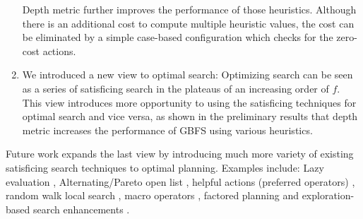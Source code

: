 \begin{enumerate}
       Depth metric further improves the performance of those
       heuristics. Although there is an additional cost to compute
       multiple heuristic values, the cost can be eliminated by a simple
       case-based configuration which checks for the zero-cost actions.
 \item We introduced a new view to optimal \astar search: Optimizing search can be seen as a series of satisficing
       search in the plateaus of an increasing order of $f$. This view introduces more opportunity to using the
       satisficing techniques for optimal search and vice versa, as shown in the preliminary results that depth
       metric increases the performance of GBFS using various heuristics.
\end{enumerate}

Future work expands the last view by introducing much more variety of
existing satisficing search techniques to optimal planning. Examples
include: Lazy evaluation \cite{richter2010lama}, Alternating/Pareto open
list \cite{RogerH10}, helpful actions (preferred operators) \cite{Hoffmann01},
random walk local search \cite{nakhost2009monte}, macro operators
\cite{Botea2005,ChrpaVM15}, factored planning
\cite{amir2003factored,brafman2006factored,Asai2015} and
exploration-based search enhancements
\cite{valenzano2014comparison,xie14type,Valenzano2016}.
